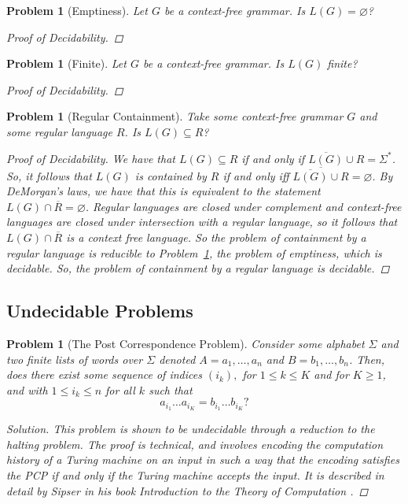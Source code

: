 \documentclass[psamsfonts]{amsart}
\newtheorem{prob}[thm]{Problem}
\theoremstyle{definition}
\theoremstyle{remark}
\numberwithin{equation}{section}
\begin{document}
\begin{prob}[Emptiness]
  \label{prob:cfg:emptiness}
  Let $G$ be a context-free grammar. Is $L(G)=\varnothing$?
  \begin{proof}[Proof of Decidability]
    \todo{}
  \end{proof}
\end{prob}

\begin{prob}[Finite]
  Let $G$ be a context-free grammar. Is $L(G)$ finite?
  \begin{proof}[Proof of Decidability]
    \todo{}
  \end{proof}
\end{prob}

\begin{prob}[Regular Containment]
Take some context-free grammar $G$ and some regular language $R$. Is
$L(G)\subseteq R$?
\begin{proof}[Proof of Decidability]
  We have that $L(G)\subseteq R$ if and only if
  $\overline{L(G)}\cup R = \Sigma^*$. So, it follows that $L(G)$ is contained by
  $R$ if and only iff $\overline{\overline{L(G)}\cup R} = \varnothing$. By
  DeMorgan's laws, we have that this is equivalent to the statement
  $L(G)\cap \overline{R} = \varnothing$. Regular languages are closed under
  complement and context-free languages are closed under intersection with a
  regular language, so it follows that $L(G)\cap \overline{R}$ is a context free
  language. So the problem of containment by a regular language is reducible to
  Problem~\ref{prob:cfg:emptiness}, the problem of emptiness, which is
  decidable. So, the problem of containment by a regular language is decidable.
\end{proof}

\end{prob}

\subsection{Undecidable Problems}
\begin{prob}[The Post Correspondence Problem]
  Consider some alphabet $\Sigma$ and two finite lists of words over $\Sigma$
  denoted $A = a_1,\dots,a_n$ and $B = b_1, \dots, b_n$. Then, does there exist
some sequence of indices $(i_k),$ for $1 \leq k \leq K$ and for
  $K\geq 1$, and with $1 \leq i_k \leq n$ for all $k$ such that
  \[
    a_{i_1}\dots a_{i_K} = b_{i_1}\dots b_{i_K}?
  \]
  \begin{proof}[Solution]
    This problem is shown to be undecidable through a reduction to the halting
    problem. The proof is technical, and involves encoding the computation
    history of a Turing machine on an input in such a way that the encoding satisfies the
    PCP if and only if the Turing machine accepts the input. It is described in
    detail by Sipser in his book \emph{Introduction to the Theory of Computation}
    \cite{sipser13:_introd_theor_comput}.
  \end{proof}
\end{prob}
\end{document}
